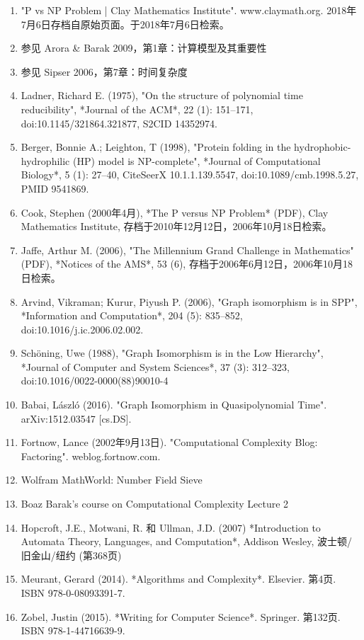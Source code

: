 \begin{enumerate}
\item "P vs NP Problem | Clay Mathematics Institute". www.claymath.org. 2018年7月6日存档自原始页面。于2018年7月6日检索。
\item 参见 Arora & Barak 2009，第1章：计算模型及其重要性
\item 参见 Sipser 2006，第7章：时间复杂度
\item Ladner, Richard E. (1975), "On the structure of polynomial time reducibility", *Journal of the ACM*, 22 (1): 151–171, doi:10.1145/321864.321877, S2CID 14352974.
\item Berger, Bonnie A.; Leighton, T (1998), "Protein folding in the hydrophobic-hydrophilic (HP) model is NP-complete", *Journal of Computational Biology*, 5 (1): 27–40, CiteSeerX 10.1.1.139.5547, doi:10.1089/cmb.1998.5.27, PMID 9541869.
\item Cook, Stephen (2000年4月), *The P versus NP Problem* (PDF), Clay Mathematics Institute, 存档于2010年12月12日，2006年10月18日检索。
\item Jaffe, Arthur M. (2006), "The Millennium Grand Challenge in Mathematics" (PDF), *Notices of the AMS*, 53 (6), 存档于2006年6月12日，2006年10月18日检索。
\item Arvind, Vikraman; Kurur, Piyush P. (2006), "Graph isomorphism is in SPP", *Information and Computation*, 204 (5): 835–852, doi:10.1016/j.ic.2006.02.002.
\item Schöning, Uwe (1988), "Graph Isomorphism is in the Low Hierarchy", *Journal of Computer and System Sciences*, 37 (3): 312–323, doi:10.1016/0022-0000(88)90010-4
\item Babai, László (2016). "Graph Isomorphism in Quasipolynomial Time". arXiv:1512.03547 [cs.DS].
\item Fortnow, Lance (2002年9月13日). "Computational Complexity Blog: Factoring". weblog.fortnow.com.
\item Wolfram MathWorld: Number Field Sieve
\item Boaz Barak's course on Computational Complexity Lecture 2
\item Hopcroft, J.E., Motwani, R. 和 Ullman, J.D. (2007) *Introduction to Automata Theory, Languages, and Computation*, Addison Wesley, 波士顿/旧金山/纽约 (第368页)
\item Meurant, Gerard (2014). *Algorithms and Complexity*. Elsevier. 第4页. ISBN 978-0-08093391-7.
\item Zobel, Justin (2015). *Writing for Computer Science*. Springer. 第132页. ISBN 978-1-44716639-9.

\end{enumerate}
